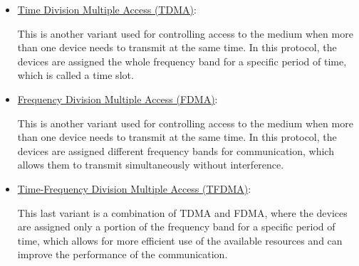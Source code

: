 \begin{itemize}
\begin{figure}
    \caption{Unslotted CSMA/CA protocol.}
    \label{fig:unslotted-csma-ca}
\end{figure}

    \item \ul{Time Division Multiple Access (TDMA)}:
    
    This is another variant used for controlling access to the medium when more than one device needs to transmit at the same time. In this protocol, the devices are assigned the whole frequency band for a specific period of time, which is called a time slot.

    \item \ul{Frequency Division Multiple Access (FDMA)}:
    
    This is another variant used for controlling access to the medium when more than one device needs to transmit at the same time. In this protocol, the devices are assigned different frequency bands for communication, which allows them to transmit simultaneously without interference.

    \item \ul{Time-Frequency Division Multiple Access (TFDMA)}:
    
    This last variant is a combination of TDMA and FDMA, where the devices are assigned only a portion of the frequency band for a specific period of time, which allows for more efficient use of the available resources and can improve the performance of the communication.
\end{itemize}

